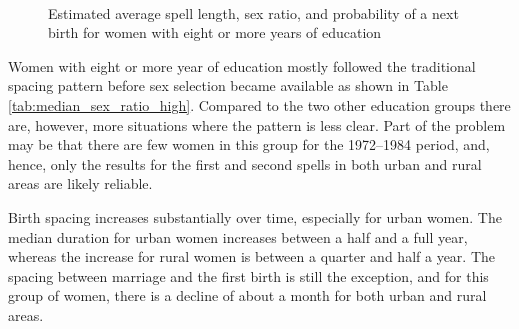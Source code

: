 \documentclass[12pt,letterpaper]{article}
\begin{document}
\begin{figure}[htpb]
\centering
{}
\\
\caption{Estimated average spell length, sex ratio, and probability of 
a next birth for women with eight or more years of education}
\label{fig:bootstrap_high}
\end{figure}




Women with eight or more year of education mostly followed 
the traditional spacing pattern before sex selection became 
available as shown in Table \ref{tab:median_sex_ratio_high}.
Compared to the two other education groups there are,
however, more situations where the pattern is less clear.
Part of the problem may be that there are few women in
this group for the 1972--1984 period, and, hence, only 
the results for the first and second spells in both urban 
and rural areas are likely reliable.


Birth spacing increases substantially over time, 
especially for urban women. 
The median duration for urban women increases between a half
and a full year, whereas the increase for rural women 
is between a quarter and half a year.
The spacing between marriage and the first birth is still the
exception, and for this group of women, there is a decline of
about a month for both urban and rural areas.
\end{document}
